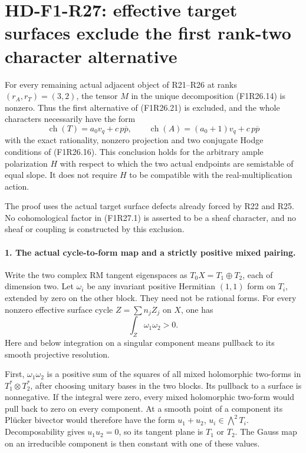 \section[HD-F1-R27: the common character tensor is nonzero]{HD-F1-R27: effective target surfaces exclude the first rank-two character alternative}
\label{sec:followup-rm-rank-two-surface-positivity}

For every remaining actual adjacent object of R21--R26
at ranks $(r_A,r_T)=(3,2)$, the tensor $M$ in the
unique decomposition (F1R26.14) is nonzero. Thus the
first alternative of (F1R26.21) is excluded, and the
whole characters necessarily have the form
\[
 \operatorname{ch}(T)=a_0v_q+c\,p\overline p,\qquad
 \operatorname{ch}(A)=(a_0+1)v_q+c\,p\overline p
 \tag{F1R27.1}
\]
with the exact rationality, nonzero projection and
two conjugate Hodge conditions of (F1R26.16).
This conclusion holds for the arbitrary ample
polarization $H$ with respect to which the two
actual endpoints are semistable of equal slope.
It does not require $H$ to be compatible with the
real-multiplication action.

The proof uses the actual target surface defects
already forced by R22 and R25. No cohomological
factor in (F1R27.1) is asserted to be a sheaf
character, and no sheaf or coupling is constructed
by this exclusion.

\paragraph{1. The actual cycle-to-form map and a strictly positive mixed pairing.}
Write the two complex RM tangent eigenspaces as
$T_0X=T_1\oplus T_2$, each of dimension two.
Let $\omega_i$ be any invariant positive Hermitian
$(1,1)$ form on $T_i$, extended by zero on the
other block. They need not be rational forms.
For every nonzero effective surface cycle
$Z=\sum n_jZ_j$ on $X$, one has
\[
                       \int_Z\omega_1\omega_2>0.
 \tag{F1R27.2}
\]
Here and below integration on a singular component
means pullback to its smooth projective resolution.

First, $\omega_1\omega_2$ is a positive sum of
the squares of all mixed holomorphic two-forms
in $T_1^*\otimes T_2^*$, after choosing unitary
bases in the two blocks. Its pullback to a
surface is nonnegative. If the integral were
zero, every mixed holomorphic two-form would
pull back to zero on every component.
At a smooth point of a component its Pl\"ucker
bivector would therefore have the form
$u_1+u_2$, $u_i\in\bigwedge^2T_i$.
Decomposability gives $u_1u_2=0$, so its tangent
plane is $T_1$ or $T_2$.
The Gauss map on an irreducible component is
then constant with one of these values.


